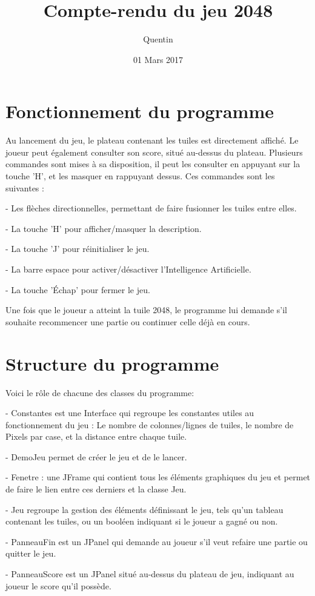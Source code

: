 \documentclass{report}
\title{Compte-rendu du jeu 2048}
\author{Quentin \bsc{SAUVAGE}}
\date{01 Mars 2017}
\begin{document}
\maketitle
\chapter{Fonctionnement du programme}
Au lancement du jeu, le plateau contenant les tuiles est directement affiché. Le joueur peut également consulter son score, situé au-dessus du plateau. Plusieurs commandes sont mises à sa disposition, il peut les consulter en appuyant sur la touche 'H', et les masquer en rappuyant dessus. Ces commandes sont les suivantes :

- Les flèches directionnelles, permettant de faire fusionner les tuiles entre elles.

- La touche 'H' pour afficher/masquer la description.

- La touche 'J' pour réinitialiser le jeu.

- La barre espace pour activer/désactiver l'Intelligence Artificielle.

- La touche 'Échap' pour fermer le jeu.

Une fois que le joueur a atteint la tuile 2048, le programme lui demande s'il souhaite recommencer une partie ou continuer celle déjà en cours.

\chapter{Structure du programme}

Voici le rôle de chacune des classes du programme:

- Constantes est une Interface qui regroupe les constantes utiles au fonctionnement du jeu : Le nombre de colonnes/lignes de tuiles, le nombre de Pixels par case, et la distance entre chaque tuile.

- DemoJeu permet de créer le jeu et de le lancer.

- Fenetre : une JFrame qui contient tous les éléments graphiques du jeu et permet de faire le lien entre ces derniers et la classe Jeu.

- Jeu regroupe la gestion des éléments définissant le jeu, tels qu'un tableau contenant les tuiles, ou un booléen indiquant si le joueur a gagné ou non.

- PanneauFin est un JPanel qui demande au joueur s'il veut refaire une partie ou quitter le jeu.

- PanneauScore est un JPanel situé au-dessus du plateau de jeu, indiquant au joueur le score qu'il possède.
\end{document}
